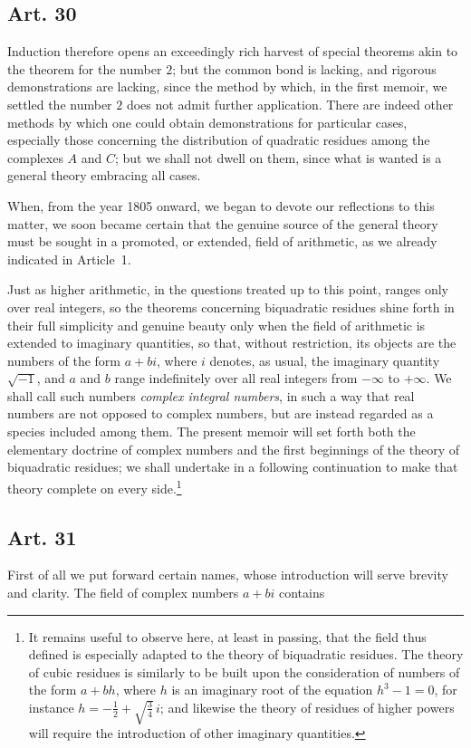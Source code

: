 \documentclass[12pt]{article}
\newcommand{\art}[1]{\subsection*{Art. #1}}
\begin{document}
\clearpage
\art{30}

Induction therefore opens an exceedingly rich harvest of special theorems akin to the theorem for the number $2$; but the common bond is lacking, and rigorous demonstrations are lacking, since the method by which, in the first memoir, we settled the number $2$ does not admit further application. There are indeed other methods by which one could obtain demonstrations for particular cases, especially those concerning the distribution of quadratic residues among the complexes $A$ and $C$; but we shall not dwell on them, since what is wanted is a general theory embracing all cases.

When, from the year 1805 onward, we began to devote our reflections to this matter, we soon became certain that the genuine source of the general theory must be sought in a promoted, or extended, field of arithmetic, as we already indicated in Article~1.

Just as higher arithmetic, in the questions treated up to this point, ranges only over real integers, so the theorems concerning biquadratic residues shine forth in their full simplicity and genuine beauty only when the field of arithmetic is extended to imaginary quantities, so that, without restriction, its objects are the numbers of the form $a+bi$, where $i$ denotes, as usual, the imaginary quantity $\sqrt{-1}$, and $a$ and $b$ range indefinitely over all real integers from $-\infty$ to $+\infty$. We shall call such numbers \textit{complex integral numbers}, in such a way that real numbers are not opposed to complex numbers, but are instead regarded as a species included among them. The present memoir will set forth both the elementary doctrine of complex numbers and the first beginnings of the theory of biquadratic residues; we shall undertake in a following continuation to make that theory complete on every side.\footnote{It remains useful to observe here, at least in passing, that the field thus defined is especially adapted to the theory of biquadratic residues. The theory of cubic residues is similarly to be built upon the consideration of numbers of the form $a+bh$, where $h$ is an imaginary root of the equation $h^3-1=0$, for instance $h=-\frac{1}{2}+\sqrt{\frac{3}{4}}\,i$; and likewise the theory of residues of higher powers will require the introduction of other imaginary quantities.}

\art{31}

First of all we put forward certain names, whose introduction will serve brevity and clarity. The field of complex numbers $a+bi$ contains
\end{document}
